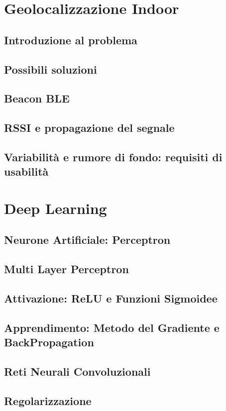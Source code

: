 \documentclass[12pt]{report}
\begin{document}
\chapter{Geolocalizzazione Indoor}
\section{Introduzione al problema}
\section{Possibili soluzioni}
\section{Beacon BLE}
\section{RSSI e propagazione del segnale}
\section{Variabilità e rumore di fondo: requisiti di usabilità}

\chapter{Deep Learning}
\section{Neurone Artificiale: Perceptron}
\section{Multi Layer Perceptron}
\section{Attivazione: ReLU e Funzioni Sigmoidee}
\section{Apprendimento: Metodo del Gradiente e BackPropagation}
\section{Reti Neurali Convoluzionali}
\section{Regolarizzazione}
\end{document}

